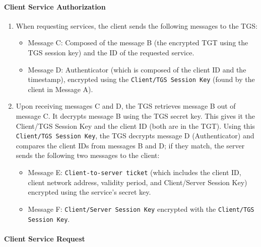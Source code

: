 \paragraph{Client Service Authorization}
\begin{enumerate}
  \item When requesting services, the client sends the following messages to the TGS:
        \begin{itemize}
          \item Message C: Composed of the message B (the encrypted TGT using the TGS session key) and the ID of the requested service.
          \item Message D: Authenticator (which is composed of the client ID and the timestamp), encrypted using the \texttt{Client/TGS Session Key} (found by the client in Message A).
        \end{itemize}
  \item Upon receiving messages C and D, the TGS retrieves message B out of message C. It decrypts message B using the TGS secret key. This gives it the Client/TGS Session Key and the client ID (both are in the TGT). Using this \texttt{Client/TGS Session Key}, the TGS decrypts message D (Authenticator) and compares the client IDs from messages B and D; if they match, the server sends the following two messages to the client:

        \begin{itemize}
          \item Message E: \texttt{Client-to-server ticket} (which includes the client ID, client network address, validity period, and Client/Server Session Key) encrypted using the service's secret key.
          \item Message F: \texttt{Client/Server Session Key} encrypted with the \texttt{Client/TGS Session Key}.
        \end{itemize}
\end{enumerate}



\paragraph{Client Service Request}

